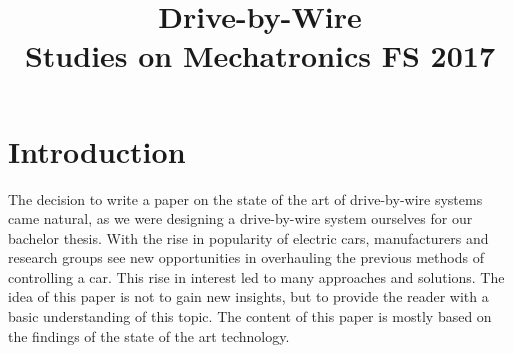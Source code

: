 \documentclass[conference]{IEEEtran}
\begin{document}
\title{
Drive-by-Wire
\\[0.5cm]
\large{Studies on Mechatronics FS 2017}
}

\author{
\and

}

\maketitle

\setlength\parindent{0pt}
\newcommand{\spn}[1]{\textsc{Span} \left\{ #1 \right\}}
\newcommand{\dimension}[1]{\textsc{dim} \left\{ #1 \right\}}
\newcommand{\real}[1]{\textsc{Re} \left( #1 \right)}
\newcommand{\imag}[1]{\textsc{Im} \left( #1 \right)}
\newcommand{\DET}[1]{\textsc{Det} \left[ #1 \right]}
\newcommand*\rfrac[2]{{}^{#1}\!/_{#2}}


\thispagestyle{plain}
\pagestyle{plain}



\section{Introduction}

The decision to write a paper on the state of the art of drive-by-wire systems came natural, as we were designing a drive-by-wire system ourselves for our bachelor thesis. With the rise in popularity of electric cars, manufacturers and research groups see new opportunities in overhauling the previous methods of controlling a car. This rise in interest led to many approaches and solutions. The idea of this paper is not to gain new insights, but to provide the reader with a basic understanding of this topic. The content of this paper is mostly based on the findings of the state of the art technology.

%
\end{document}
